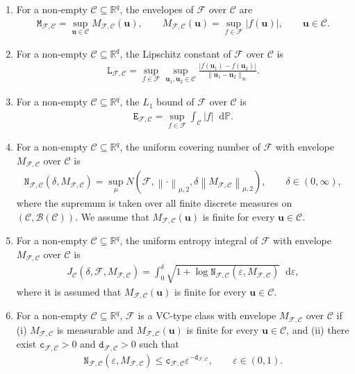 \documentclass[10pt]{article}
\renewcommand{\P}{\mathbb{P}}
\newcommand{\reals}{\mathbb{R}}
\newcommand{\dif}{\mathop{}\!\mathrm{d}}
\newcommand{\norm}[1]{\left\lVert#1\right\rVert}
\newcommand{\bu}{\mathbf{u}}
\newcommand{\B}{\mathcal{B}}
\newcommand{\C}{\mathcal{C}}
\newcommand{\F}{\mathcal{F}}
\newcommand{\ttc}{\mathtt{c}}
\newcommand{\ttK}{\mathtt{K}}
\newcommand{\ttL}{\mathtt{L}}
\newcommand{\ttM}{\mathtt{M}}
\newcommand{\ttN}{\mathtt{N}}
\newcommand{\ttTV}{\mathtt{TV}}
\begin{document}
\begin{enumerate}[label=(\roman*)]
    \begin{align*}
        \ttTV_{\F, \mathcal{D} \cap \mathcal{C}}  \leq \ttK_{\F, \mathcal{C}} \ell^{q-1}.
    \end{align*}
    \item For a non-empty $\mathcal{C} \subseteq \reals^q$, the envelopes of $\F$ over $\mathcal{C}$ are
    \begin{align*}
        \ttM_{\F,\C} = \sup_{\bu \in \C }M_{\F,\C}(\bu),
        \qquad M_{\F,\C}(\bu) = \sup_{f \in \F}|f(\bu)|,
        \qquad \bu \in \C.
    \end{align*}
    \item  For a non-empty $\mathcal{C} \subseteq \reals^q$, the Lipschitz constant of $\F$ over $\C$ is
    \begin{align*}
        \ttL_{\F,\C} = \sup_{f \in \F}\sup_{\bu_1, \bu_2 \in \C} \frac{|f(\bu_1) - f(\bu_2)|}{\|\bu_1 - \bu_2\|_\infty}.
    \end{align*}
    \item For a non-empty $\mathcal{C} \subseteq \reals^q$, the $L_1$ bound of $\F$ over $\C$ is
    \begin{align*}
        \mathtt{E}_{\F,\C} = \sup_{f \in \F} \int_{\C} |f| \dif\P.
    \end{align*}
    \item   For a non-empty $\mathcal{C} \subseteq \reals^q$, the uniform covering number of $\F$ with envelope $M_{\F,\C}$ over $\C$ is
    \begin{align*}
        \ttN_{\F,\C}(\delta,M_{\F,\C}) = \sup_{\mu} N(\F,\norm{\cdot}_{\mu,2},\delta \norm{M_{\F,\C}}_{\mu,2}),
        \qquad \delta \in (0, \infty),
    \end{align*}
    where the supremum is taken over all finite discrete measures on $(\C, \B(\C))$. We assume that $M_{\F,\C}(\bu)$ is finite for every $\bu \in \C$.
    \item  For a non-empty $\mathcal{C} \subseteq \reals^q$, the uniform entropy integral of $\F$ with envelope $M_{\F,\C}$ over $\C$ is
    \begin{align*}
        J_\C(\delta, \F, M_{\F,\C}) = \int_0^{\delta} \sqrt{1 + \log \ttN_{\F,\C}(\varepsilon,M_{\F,\C})} \dif \varepsilon,
    \end{align*}
    where it is assumed that $M_{\F,\C}(\bu)$ is finite for every $\bu \in \C$.
    \item For a non-empty $\mathcal{C} \subseteq \reals^q$, $\F$ is a VC-type class with envelope $M_{\F,\C}$ over $\C$ if (i) $M_{\F,\C}$ is measurable and $M_{\F,\C}(\bu)$ is finite for every $\bu \in \C$, and (ii) there exist $\ttc_{\F,\C}>0$ and $\mathtt{d}_{\F,\C}>0$ such that
    \begin{align*}
        \ttN_{\F,\C}(\varepsilon,M_{\F,\C}) \leq \ttc_{\F,\C} \varepsilon^{-\mathtt{d}_{\F,\C}},
        \qquad \varepsilon\in(0,1).
    \end{align*}

\end{enumerate}
\end{document}
